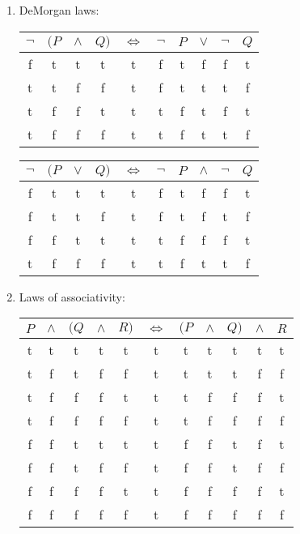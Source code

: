 \documentclass[leqno]{article}
\renewcommand{\iff}{\Leftrightarrow}
\begin{document}
\begin{enumerate}
\item DeMorgan laws:

\begin{tabular}{cccccccccc}
  \hline
  $\neg$ & $(P$ & $\land$ & $Q)$ & $\iff$ & $\neg$ & $P$ & $\lor$ & $\neg$ & $Q$ \\
  \hline
     f   &   t  &    t    &  t   &    t   &    f   &  t  &    f   &    f   &  t  \\
     t   &   t  &    f    &  f   &    t   &    f   &  t  &    t   &    t   &  f  \\
     t   &   f  &    f    &  t   &    t   &    t   &  f  &    t   &    f   &  t  \\
     t   &   f  &    f    &  f   &    t   &    t   &  f  &    t   &    t   &  f  \\
  \hline
\end{tabular}

\begin{tabular}{cccccccccc}
  \hline
  $\neg$ & $(P$ & $\lor$ & $Q)$ & $\iff$ & $\neg$ & $P$ & $\land$ & $\neg$ & $Q$ \\
  \hline
     f   &   t  &   t    &  t   &    t   &    f   &  t  &    f    &    f   &  t  \\
     f   &   t  &   t    &  f   &    t   &    f   &  t  &    f    &    t   &  f  \\
     f   &   f  &   t    &  t   &    t   &    t   &  f  &    f    &    f   &  t  \\
     t   &   f  &   f    &  f   &    t   &    t   &  f  &    t    &    t   &  f  \\
  \hline
\end{tabular}

\item Laws of associativity:

\begin{tabular}{ccccccccccc}
  \hline
  $P$ & $\land$ & $(Q$ & $\land$ & $R)$ & $\iff$ & $(P$ & $\land$ & $Q)$ & $\land$ & $R$ \\
  \hline
   t  &    t    &   t  &    t    &  t   &   t    &   t  &    t    &  t   &    t    &  t  \\
   t  &    f    &   t  &    f    &  f   &   t    &   t  &    t    &  t   &    f    &  f  \\
   t  &    f    &   f  &    f    &  t   &   t    &   t  &    f    &  f   &    f    &  t  \\
   t  &    f    &   f  &    f    &  f   &   t    &   t  &    f    &  f   &    f    &  f  \\
   f  &    f    &   t  &    t    &  t   &   t    &   f  &    f    &  t   &    f    &  t  \\
   f  &    f    &   t  &    f    &  f   &   t    &   f  &    f    &  t   &    f    &  f  \\
   f  &    f    &   f  &    f    &  t   &   t    &   f  &    f    &  f   &    f    &  t  \\
   f  &    f    &   f  &    f    &  f   &   t    &   f  &    f    &  f   &    f    &  f  \\
  \hline
\end{tabular}


\end{enumerate}
\end{document}
